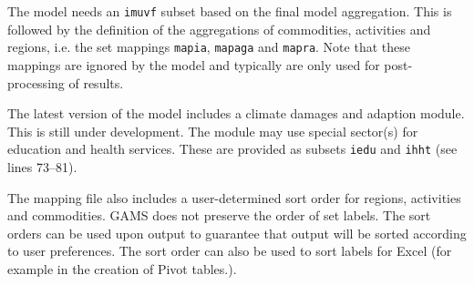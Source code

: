 The model needs an \texttt{imuvf} subset based on the final model aggregation.
This is followed by the definition of the aggregations of commodities,
activities and regions, i.e. the set mappings \texttt{mapia}, \texttt{mapaga}
and \texttt{mapra}. Note that these mappings are ignored by the model and
typically are only used for post-processing of results.

The latest version of the model includes a climate damages and
adaption module. This is still under development. The module
may use special sector(s) for education and health services. These
are provided as subsets \texttt{iedu} and \texttt{ihht} (see lines 73--81).

The mapping file also includes a user-determined sort order for regions,
activities and commodities. GAMS does not preserve the order of set labels. The
sort orders can be used upon output to guarantee that output will be sorted
according to user preferences. The sort order can also be used to sort labels
for Excel (for example in the creation of Pivot tables.).

